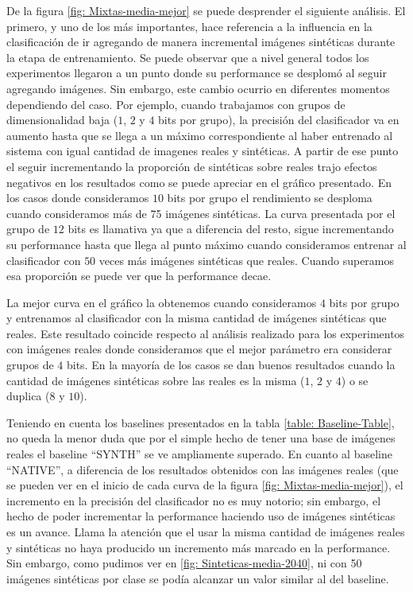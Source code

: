 	De la figura \ref{fig: Mixtas-media-mejor} se puede desprender el siguiente análisis. El primero, y uno de los más importantes, hace referencia a la influencia en la clasificación de ir agregando de manera incremental imágenes sintéticas durante la etapa de entrenamiento. Se puede observar que a nivel general todos los experimentos llegaron a un punto donde su performance se desplomó al seguir agregando imágenes. Sin embargo, este cambio ocurrio en diferentes momentos dependiendo del caso. Por ejemplo, cuando trabajamos con grupos de dimensionalidad baja ($1$, $2$ y $4$ bits por grupo), la precisión del clasificador va en aumento hasta que se llega a un máximo correspondiente al haber entrenado al sistema con igual cantidad de imagenes reales y sintéticas. A partir de ese punto el seguir incrementando la proporción de sintéticas sobre reales trajo efectos negativos en los resultados como se puede apreciar en el gráfico presentado. En los casos donde consideramos $10$ bits por grupo el rendimiento se desploma cuando consideramos más de 75 imágenes sintéticas. La curva presentada por el grupo de $12$ bits es llamativa ya que a diferencia del resto, sigue incrementando su performance hasta que llega al punto máximo cuando consideramos entrenar al clasificador con $50$ veces más imágenes sintéticas que reales. Cuando superamos esa proporción se puede ver que la performance decae.

	 La mejor curva en el gráfico la obtenemos cuando consideramos $4$ bits por grupo y entrenamos al clasificador con la misma cantidad de imágenes sintéticas que reales. Este resultado coincide respecto al análisis realizado para los experimentos con imágenes reales donde consideramos que el mejor parámetro era considerar grupos de $4$ bits. En la mayoría de los casos se dan buenos resultados cuando la cantidad de imágenes sintéticas sobre las reales es la misma ($1$, $2$ y $4$) o se duplica ($8$ y $10$).

	 Teniendo en cuenta los baselines presentados en la tabla \ref{table: Baseline-Table}, no queda la menor duda que por el simple hecho de tener una base de imágenes reales el baseline ``SYNTH'' se ve ampliamente superado. En cuanto al baseline ``NATIVE'', a diferencia de los resultados obtenidos con las imágenes reales (que se pueden ver en el inicio de cada curva de la figura \ref{fig: Mixtas-media-mejor}), el incremento en la precisión del clasificador no es muy notorio; sin embargo, el hecho de poder incrementar la performance haciendo uso de imágenes sintéticas es un avance. Llama la atención que el usar la misma cantidad de imágenes reales y sintéticas no haya producido un incremento más marcado en la performance. Sin embargo, como pudimos ver en \ref{fig: Sinteticas-media-2040}, ni con 50 imágenes sintéticas por clase se podía alcanzar un valor similar al del baseline.


